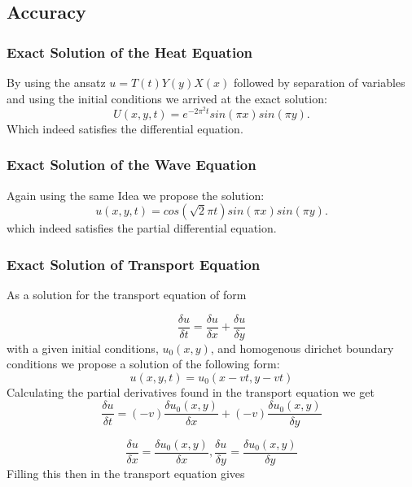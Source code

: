 \subsection{Accuracy}
\subsubsection{Exact Solution of the Heat Equation}
By using the ansatz $u = T(t)Y(y)X(x)$ followed by separation of variables and using the initial conditions we arrived at the exact solution:
\begin{equation}
U(x,y,t) = e^{-2\pi^2 t}sin(\pi x)sin(\pi y).
\end{equation}
Which indeed satisfies the differential equation.
\subsubsection{Exact Solution of the Wave Equation}
Again using the same Idea we propose the solution:
\begin{equation}
u(x,y,t) = cos(\sqrt{2}\pi t)sin(\pi x)sin(\pi y).
\end{equation}
which indeed satisfies the partial differential equation.
\subsubsection{Exact Solution of Transport Equation}
As a solution for the transport equation of form

\begin{equation}
\frac{\delta u}{\delta t} = \frac{\delta u}{\delta x} + \frac{\delta u}{\delta y}
\end{equation}
with a given initial conditions, $u_0(x,y)$, and homogenous dirichet boundary conditions we propose a solution of the following form:
\begin{equation}
u(x,y,t) = u_0(x-vt,y-vt)
\label{proposal}
\end{equation}
Calculating the partial derivatives found in the transport equation we get
\begin{equation}
\frac{\delta u}{\delta t} =(-v) \frac{\delta u_0(x,y)}{\delta x} +(-v) \frac{\delta u_0(x,y)}{\delta y} 
\end{equation}

\begin{equation}
\frac{\delta u}{\delta x} = \frac{\delta u_0(x,y)}{\delta x} ,\frac{\delta u}{\delta y} = \frac{\delta u_0(x,y)}{\delta y} 
\end{equation}
Filling this then in the transport equation gives

